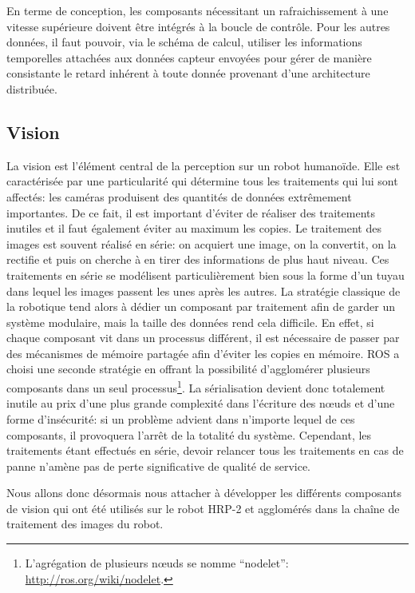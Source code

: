 En terme de conception, les composants nécessitant un rafraichissement
à une vitesse supérieure doivent être intégrés à la boucle de
contrôle. Pour les autres données, il faut pouvoir, via le schéma de
calcul, utiliser les informations temporelles attachées aux
données capteur envoyées pour gérer de manière consistante le retard
inhérent à toute donnée provenant d'une architecture distribuée.


\subsection{Vision}


La vision est l'élément central de la
perception sur un robot humanoïde. Elle est caractérisée par une
particularité qui détermine tous les traitements qui lui sont
affectés: les caméras produisent des quantités de données extrêmement
importantes. De ce fait, il est important d'éviter de réaliser des
traitements inutiles et il faut également éviter au maximum les
copies. Le traitement des images est souvent réalisé en série: on
acquiert une image, on la convertit, on la rectifie et puis on cherche
à en tirer des informations de plus haut niveau. Ces traitements en
série se modélisent particulièrement bien sous la forme d'un tuyau
dans lequel les images passent les unes après les autres. La stratégie
classique de la robotique tend alors à dédier un composant par
traitement afin de garder un système modulaire, mais la taille des
données rend cela difficile. En effet, si chaque composant vit dans un
processus différent, il est nécessaire de passer par des mécanismes de
mémoire partagée afin d'éviter les copies en mémoire. ROS a choisi une
seconde stratégie en offrant la possibilité d'agglomérer plusieurs
composants dans un seul processus\footnote{L'agrégation de plusieurs
  n\oe uds se nomme ``nodelet'':
  \url{http://ros.org/wiki/nodelet}.}. La sérialisation devient donc
totalement inutile au prix d'une plus grande complexité dans
l'écriture des n\oe uds et d'une forme d'insécurité: si un problème
advient dans n'importe lequel de ces composants, il provoquera l'arrêt
de la totalité du système. Cependant, les traitements étant effectués
en série, devoir relancer tous les traitements en cas de panne n'amène
pas de perte significative de qualité de service.


Nous allons donc désormais nous attacher à développer les différents
composants de vision qui ont été utilisés sur le robot
HRP-2 et agglomérés dans la chaîne de traitement des
images du robot.


